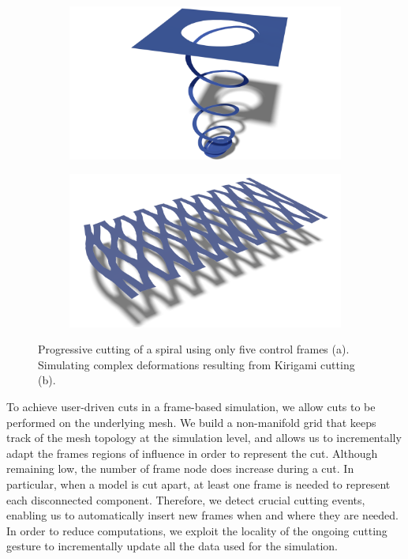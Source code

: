 \documentclass[11pt, oneside, a4paper]{memoir}
\begin{document}
\begin{figure}[t]
\centering
\begin{subfigure}[b]{0.45\linewidth}
\includegraphics[width=\linewidth]{images/cutting-mig2015/Spiral2.pdf}
\caption{\label{fig:spiral}}
\end{subfigure}
\hfill
\begin{subfigure}[b]{0.45\linewidth}
\includegraphics[width=\linewidth]{images/cutting-mig2015/Kirigami.pdf}
\caption{\label{fig:kirigami}}
\end{subfigure}
\caption{\label{fig:teaser} Progressive cutting of a spiral using only five control frames (a). Simulating complex deformations resulting from Kirigami cutting (b).}
\end{figure}

To achieve user-driven cuts in a frame-based simulation, we allow cuts to be performed on the underlying mesh.
We build a non-manifold grid that keeps track of the mesh topology at the simulation level, and allows us to incrementally adapt the frames regions of influence in order to  represent the cut.
Although remaining low, the number of frame node does increase during a cut. In particular, when a model is cut apart, at least one frame is needed to represent each disconnected component. 
Therefore, we detect crucial cutting events, enabling us to automatically insert new frames when and where they are needed.
In order to reduce computations, we exploit the locality of the ongoing cutting gesture to incrementally update all the data used for the simulation.
\end{document}
